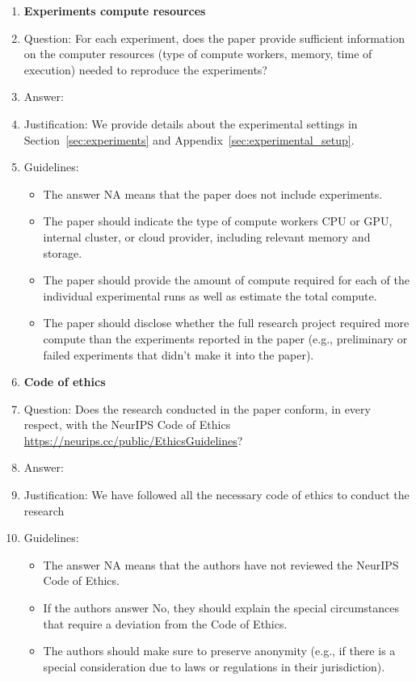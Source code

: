 \begin{enumerate}
\item {\bf Experiments compute resources}
    \item[] Question: For each experiment, does the paper provide sufficient information on the computer resources (type of compute workers, memory, time of execution) needed to reproduce the experiments?
    \item[] Answer: \answerYes{} %
    \item[] Justification: We provide details about the experimental settings in Section~\ref{sec:experiments} and Appendix~\ref{sec:experimental_setup}.
    \item[] Guidelines:
    \begin{itemize}
        \item The answer NA means that the paper does not include experiments.
        \item The paper should indicate the type of compute workers CPU or GPU, internal cluster, or cloud provider, including relevant memory and storage.
        \item The paper should provide the amount of compute required for each of the individual experimental runs as well as estimate the total compute. 
        \item The paper should disclose whether the full research project required more compute than the experiments reported in the paper (e.g., preliminary or failed experiments that didn't make it into the paper). 
    \end{itemize}
    
\item {\bf Code of ethics}
    \item[] Question: Does the research conducted in the paper conform, in every respect, with the NeurIPS Code of Ethics \url{https://neurips.cc/public/EthicsGuidelines}?
    \item[] Answer: \answerYes{} %
    \item[] Justification: We have followed all the necessary code of ethics to conduct the research %
    \item[] Guidelines:
    \begin{itemize}
        \item The answer NA means that the authors have not reviewed the NeurIPS Code of Ethics.
        \item If the authors answer No, they should explain the special circumstances that require a deviation from the Code of Ethics.
        \item The authors should make sure to preserve anonymity (e.g., if there is a special consideration due to laws or regulations in their jurisdiction).
    \end{itemize}



\end{enumerate}

